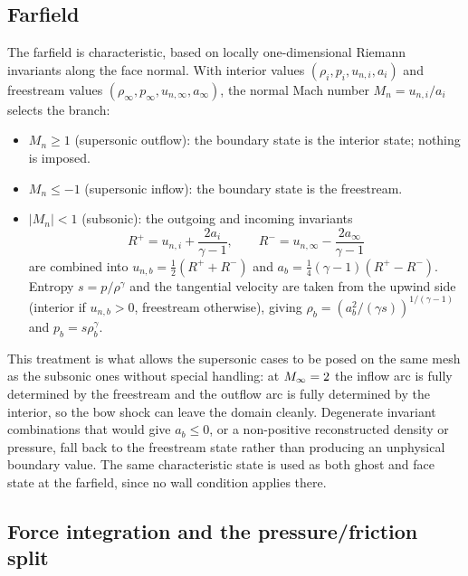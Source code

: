 \subsection{Farfield}

The farfield is characteristic, based on locally one-dimensional Riemann
invariants along the face normal. With interior values $(\rho_i,p_i,u_{n,i},a_i)$
and freestream values $(\rho_\infty,p_\infty,u_{n,\infty},a_\infty)$, the normal
Mach number $M_n=u_{n,i}/a_i$ selects the branch:

\begin{itemize}
  \item $M_n\ge 1$ (supersonic outflow): the boundary state is the interior state;
  nothing is imposed.
  \item $M_n\le -1$ (supersonic inflow): the boundary state is the freestream.
  \item $|M_n|<1$ (subsonic): the outgoing and incoming invariants
  \begin{equation}
    R^+=u_{n,i}+\frac{2a_i}{\gamma-1},\qquad
    R^-=u_{n,\infty}-\frac{2a_\infty}{\gamma-1}
  \end{equation}
  are combined into
  $u_{n,b}=\tfrac12(R^++R^-)$ and $a_b=\tfrac14(\gamma-1)(R^+-R^-)$. Entropy
  $s=p/\rho^\gamma$ and the tangential velocity are taken from the upwind side
  (interior if $u_{n,b}>0$, freestream otherwise), giving
  $\rho_b=\left(a_b^2/(\gamma s)\right)^{1/(\gamma-1)}$ and
  $p_b=s\rho_b^\gamma$.
\end{itemize}

This treatment is what allows the supersonic cases to be posed on the same mesh
as the subsonic ones without special handling: at $M_\infty=2$ the inflow arc is
fully determined by the freestream and the outflow arc is fully determined by the
interior, so the bow shock can leave the domain cleanly. Degenerate invariant
combinations that would give $a_b\le0$, or a non-positive reconstructed density or
pressure, fall back to the freestream state rather than producing an unphysical
boundary value. The same characteristic state is used as both ghost and face
state at the farfield, since no wall condition applies there.

\subsection{Force integration and the pressure/friction split}
\label{sec:forces}


